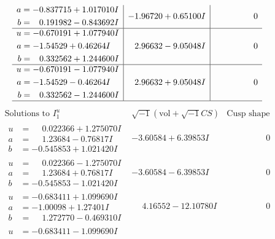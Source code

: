 \documentclass[1p]{elsarticle_modified}
\theoremstyle{definition}
\newcommand{\I}{\sqrt{-1}}
\begin{document}
$$\begin{array}{c|c|c}
\begin{aligned}
a &= -0.837715 + 1.017010 I \\
b &= \phantom{-}0.191982 - 0.843692 I\end{aligned}
 & -1.96720 + 0.65100 I & \phantom{-0.000000 } 0 \\ \hline\begin{aligned}
u &= -0.670191 + 1.077940 I \\
a &= -1.54529 + 0.46264 I \\
b &= \phantom{-}0.332562 + 1.244600 I\end{aligned}
 & \phantom{-}2.96632 - 9.05048 I & \phantom{-0.000000 } 0 \\ \hline\begin{aligned}
u &= -0.670191 - 1.077940 I \\
a &= -1.54529 - 0.46264 I \\
b &= \phantom{-}0.332562 - 1.244600 I\end{aligned}
 & \phantom{-}2.96632 + 9.05048 I & \phantom{-0.000000 } 0\\
 \hline 
 \end{array}$$\newpage$$\begin{array}{c|c|c}  
\text{Solutions to }I^u_{1}& \I (\text{vol} + \sqrt{-1}CS) & \text{Cusp shape}\\
 \hline 
\begin{aligned}
u &= \phantom{-}0.022366 + 1.275070 I \\
a &= \phantom{-}1.23684 - 0.76817 I \\
b &= -0.545853 + 1.021420 I\end{aligned}
 & -3.60584 + 6.39853 I & \phantom{-0.000000 } 0 \\ \hline\begin{aligned}
u &= \phantom{-}0.022366 - 1.275070 I \\
a &= \phantom{-}1.23684 + 0.76817 I \\
b &= -0.545853 - 1.021420 I\end{aligned}
 & -3.60584 - 6.39853 I & \phantom{-0.000000 } 0 \\ \hline\begin{aligned}
u &= -0.683411 + 1.099690 I \\
a &= -1.00098 + 1.27401 I \\
b &= \phantom{-}1.272770 - 0.469310 I\end{aligned}
 & \phantom{-}4.16552 - 12.10780 I & \phantom{-0.000000 } 0 \\ \hline\begin{aligned}
u &= -0.683411 - 1.099690 I \\

\end{aligned}
\end{array}$$
\end{document}
